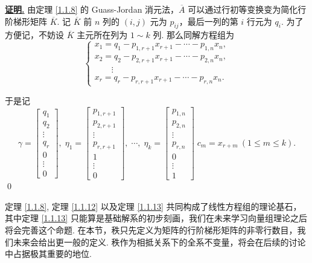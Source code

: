 \documentclass[10pt,openany]{article}
\theoremstyle{thmstyle} %
\theoremstyle{defstyle} %
\theoremstyle{prostyle} %
\theoremstyle{exastyle}
\theoremstyle{remstyle}
\renewenvironment{proof}[1][证明]{\par\underline{\textbf{#1.}} \;\fangsong}{\qed\par}
\begin{document}
\begin{proof}
	由定理 \ref{1.1.8} 的 Guass-Jordan 消元法，\( \overline{A} \) 可以通过行初等变换变为简化行阶梯形矩阵 \( \overline{K} \). 记 \( \overline{K} \) 前 \( n \) 列的 \( (i,j) \) 元为 \( p_{ij} \)，最后一列的第 \( i \) 行元为 \( q_i \). 为了方便记，不妨设 \( \overline{K} \) 主元所在列为 \( 1 \sim k \) 列. 那么同解方程组为
	\[ \left\{ \begin{array}{l}
		x_1= q_1-p_{1,r+1}x_{r+1}-\cdots-p_{1,n}x_n, \\
		x_2= q_2-p_{2,r+1}x_{r+1}-\cdots-p_{2,n}x_n, \\
		\qquad \vdots \\
		x_r= q_r-p_{r,r+1}x_{r+1}-\cdots-p_{r,n}x_n. 
	\end{array}\right. \]
	
	于是记
	\[ \gamma=\begin{bmatrix}
		q_1 \\ q_2 \\ \vdots \\ q_r \\ 0  \\ \vdots \\ 0
	\end{bmatrix},\; \eta_1=\begin{bmatrix}
	p_{1,r+1} \\ p_{2,r+1} \\ \vdots \\ p_{r,r+1} \\ 1 \\ \vdots \\ 0
	\end{bmatrix}, \; \cdots, \; \eta_k=\begin{bmatrix}
	p_{1,n} \\ p_{2,n} \\ \vdots \\ p_{r,n} \\ 0 \\ \vdots \\ 1
	\end{bmatrix}  \; c_{m}=x_{r+m} \ ( 1 \leq m \leq k). \]
\end{proof}

定理 \ref{1.1.8}, 定理 \ref{1.1.12} 以及定理 \ref{1.1.13} 共同构成了线性方程组的理论基石，其中定理 \ref{1.1.13} 只能算是基础解系的初步刻画，我们在未来学习向量组理论之后将会完善这个命题. 在本节，秩只先定义为矩阵的行阶梯形矩阵的非零行数目，我们未来会给出更一般的定义. 秩作为相抵关系下的全系不变量，将会在后续的讨论中占据极其重要的地位.
 
\end{document}

